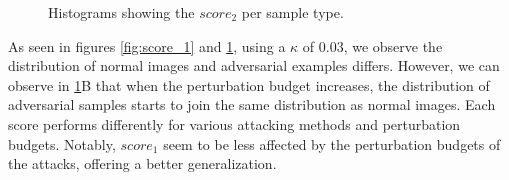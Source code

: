 \begin{figure}[htp]


    \caption{Histograms showing the $score_{2}$ per sample type.}
    \label{fig:score_2}
\end{figure}

As seen in figures \ref{fig:score_1} and \ref{fig:score_2}, using a $\kappa$ of
$0.03$, we observe the distribution of normal images and adversarial examples
differs. However, we can observe in \ref{fig:score_2}B that when the
perturbation budget increases, the distribution of adversarial samples starts to
join the same distribution as normal images. Each score performs differently for
various attacking methods and perturbation budgets. Notably, $score_{1}$ seem to
be less affected by the perturbation budgets of the attacks, offering a better
generalization.

